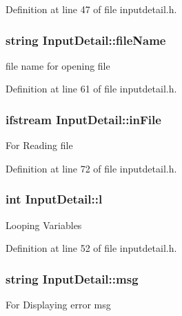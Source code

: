 Definition at line 47 of file inputdetail.\-h.

\hypertarget{classInputDetail_a4a7fb27e52bed0f40de143634f2c486b}{
\subsubsection[{file\-Name}]{\setlength{\rightskip}{0pt plus 5cm}string Input\-Detail\-::file\-Name\hspace{0.3cm}{\ttfamily [protected]}}}\label{classInputDetail_a4a7fb27e52bed0f40de143634f2c486b}
file name for opening file 

Definition at line 61 of file inputdetail.\-h.

\hypertarget{classInputDetail_a4c62c1934fbfcdcc8e2afaee44a87c15}{
\subsubsection[{in\-File}]{\setlength{\rightskip}{0pt plus 5cm}ifstream Input\-Detail\-::in\-File\hspace{0.3cm}{\ttfamily [protected]}}}\label{classInputDetail_a4c62c1934fbfcdcc8e2afaee44a87c15}
For Reading file 

Definition at line 72 of file inputdetail.\-h.

\hypertarget{classInputDetail_a3a950727518c2f6ed3c068125a037b9e}{
\subsubsection[{l}]{\setlength{\rightskip}{0pt plus 5cm}int Input\-Detail\-::l\hspace{0.3cm}{\ttfamily [protected]}}}\label{classInputDetail_a3a950727518c2f6ed3c068125a037b9e}
Looping Variables 

Definition at line 52 of file inputdetail.\-h.

\hypertarget{classInputDetail_a1abb16cd695678c3fa05e3c812823fee}{
\subsubsection[{msg}]{\setlength{\rightskip}{0pt plus 5cm}string Input\-Detail\-::msg\hspace{0.3cm}{\ttfamily [protected]}}}\label{classInputDetail_a1abb16cd695678c3fa05e3c812823fee}
For Displaying error msg 

